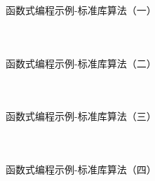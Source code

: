 \documentclass[UTF8,aspectratio=169]{beamer}
\begin{document}
\begin{frame}[fragile]{函数式编程示例-标准库算法（一）}
    \begin{columns}
        \begin{column}{0.48\textwidth}
            \inputminted[firstline=1,lastline=16]{cpp}{code/functional_programming_6.cpp}
        \end{column}
        \begin{column}{0.48\textwidth}
            \inputminted[firstline=18,lastline=31]{cpp}{code/functional_programming_6.cpp}
        \end{column}
    \end{columns}
\end{frame}

\begin{frame}[fragile]{函数式编程示例-标准库算法（二）}
    \begin{columns}
        \begin{column}{0.48\textwidth}
            \inputminted[firstline=33,lastline=47]{cpp}{code/functional_programming_6.cpp}
        \end{column}
        \begin{column}{0.48\textwidth}
            \inputminted[firstline=49,lastline=60]{cpp}{code/functional_programming_6.cpp}
        \end{column}
    \end{columns}
\end{frame}

\begin{frame}[fragile]{函数式编程示例-标准库算法（三）}
    \begin{columns}
        \begin{column}{0.48\textwidth}
            \inputminted[firstline=62,lastline=76]{cpp}{code/functional_programming_6.cpp}
        \end{column}
        \begin{column}{0.48\textwidth}
            \inputminted[firstline=78,lastline=91]{cpp}{code/functional_programming_6.cpp}
        \end{column}
    \end{columns}
\end{frame}

\begin{frame}[fragile]{函数式编程示例-标准库算法（四）}
    \begin{columns}
        \begin{column}{0.48\textwidth}
            \inputminted[firstline=93,lastline=107]{cpp}{code/functional_programming_6.cpp}
        \end{column}
        \begin{column}{0.48\textwidth}
            \inputminted[firstline=109,lastline=122]{cpp}{code/functional_programming_6.cpp}
        \end{column}
    \end{columns}
\end{frame}
\end{document}
